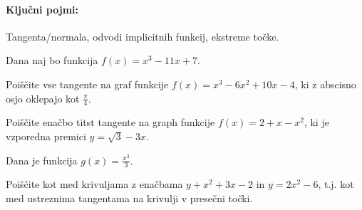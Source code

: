 \documentclass[11pt,a4paper]{exam}
\renewcommand{\{}{\lbrace}
\renewcommand{\}}{\rbrace}
\begin{document}
\paragraph{Ključni pojmi:} Tangenta/normala, odvodi implicitnih funkcij, ekstreme točke.
\begin{questions}
	\question	
	Dana naj bo funkcija $f(x) = x^{3} - 11 x + 7$.
	
	\question
	Poiščite vse tangente na graf funkcije $f(x) = x^{3} -6x^{2}+10x-4$, ki z abscisno osjo oklepajo kot $\frac{\pi}{4}$.

	\question Poiščite enačbo titst tangente na graph funkcije $f(x)= 2+x-x^{2}$, ki je vzporedna premici $y=\sqrt{3} - 3x$.

	\question
	Dana je funkcija $g(x) = \frac{x^{3}}{3}$.

	\question
	Poiščite kot med krivuljama z enačbama $y + x^{2}+3x -2$ in $y = 2x^{2}-6$, t.j. kot med ustreznima tangentama na krivulji v presečni točki.


\end{questions}
\end{document}
